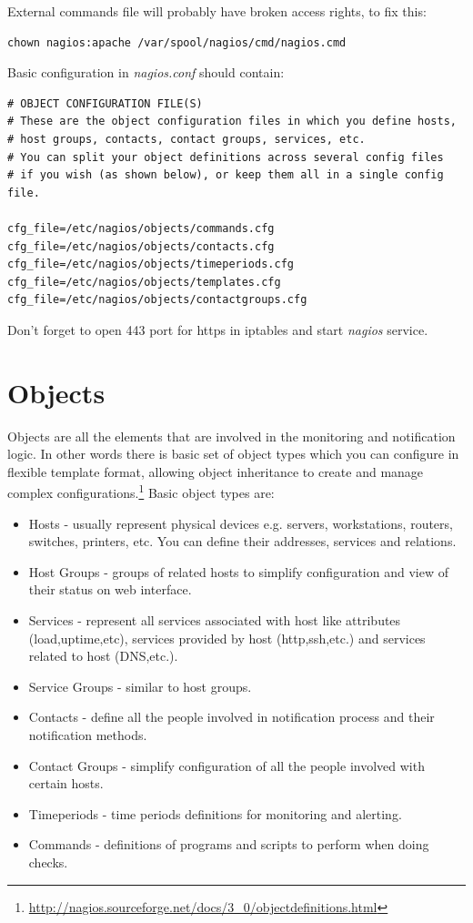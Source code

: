\documentclass[10pt,a4paper,final]{report}
\begin{document}
External commands file will probably have broken access rights, to fix this:
\begin{lstlisting}
chown nagios:apache /var/spool/nagios/cmd/nagios.cmd
\end{lstlisting}
Basic configuration in \emph{nagios.conf} should contain:
\begin{lstlisting}
# OBJECT CONFIGURATION FILE(S)
# These are the object configuration files in which you define hosts,
# host groups, contacts, contact groups, services, etc.
# You can split your object definitions across several config files
# if you wish (as shown below), or keep them all in a single config file.

cfg_file=/etc/nagios/objects/commands.cfg
cfg_file=/etc/nagios/objects/contacts.cfg
cfg_file=/etc/nagios/objects/timeperiods.cfg
cfg_file=/etc/nagios/objects/templates.cfg
cfg_file=/etc/nagios/objects/contactgroups.cfg
\end{lstlisting}
Don't forget to open 443 port for https in iptables and start \emph{nagios} service.

\section{Objects}
Objects are all the elements that are involved in the monitoring and notification logic. In other words there is basic set of object types which you can configure in flexible template format, allowing object inheritance to create and manage complex configurations.\footnote{\url{http://nagios.sourceforge.net/docs/3\_0/objectdefinitions.html}} Basic object types are:
\begin{itemize}
\item Hosts - usually represent physical devices e.g. servers, workstations, routers, switches, printers, etc. You can define their addresses, services and relations.
\item Host Groups - groups of related hosts to simplify configuration and view of their status on web interface.
\item Services - represent all services associated with host like attributes (load,uptime,etc), services provided by host (http,ssh,etc.) and services related to host (DNS,etc.).
\item Service Groups - similar to host groups.
\item Contacts - define all the people involved in notification process and their notification methods.
\item Contact Groups - simplify configuration of all the people involved with certain hosts.
\item Timeperiods - time periods definitions for monitoring and alerting.
\item Commands - definitions of programs and scripts to perform when doing checks.
\end{itemize}
\end{document}
